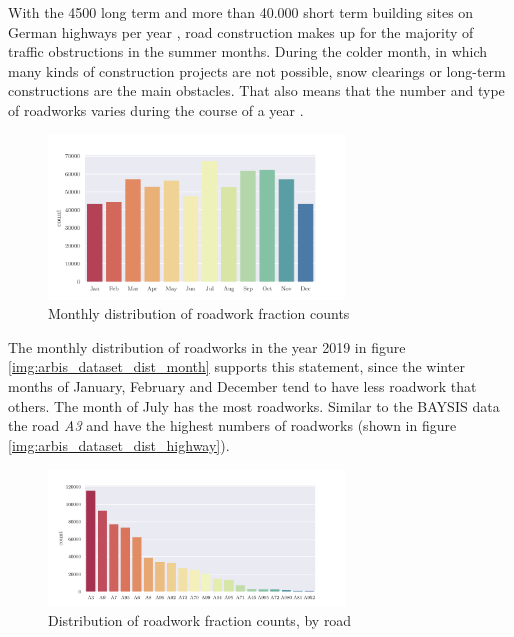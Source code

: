 With the 4500 long term and more than 40.000 short term building sites on German highways per year \parencite{LAPID2018,Stmi2020}, road construction makes up for the majority of traffic obstructions in the summer months. During the colder month, in which many kinds of construction projects are not possible, snow clearings or long-term constructions are the main obstacles. That also means that the number and type of roadworks varies during the course of a year \parencite{Stmi2020}. 
\begin{figure}[ht]
	\centering
	\includegraphics[width=0.7\textwidth]{../CorrAnalysis/data/ArbIS/01_dataset/plots/arbis_dataset_hist_month}
	\caption{Monthly distribution of roadwork fraction counts}
	\label{img:arbis_dataset_dist_month}
\end{figure}
The monthly distribution of roadworks in the year 2019 in figure \autoref{img:arbis_dataset_dist_month} supports this statement, since the winter months of January, February and December tend to have less roadwork that others. The month of July has the most roadworks. Similar to the BAYSIS data the road \textit{A3} and  have the highest numbers of roadworks (shown in figure \autoref{img:arbis_dataset_dist_highway}).
\begin{figure}[ht]
	\centering
	\includegraphics[width=0.7\textwidth]{../CorrAnalysis/data/ArbIS/01_dataset/plots/arbis_dataset_hist_highway}
	\caption{Distribution of roadwork fraction counts, by road}
	\label{img:arbis_dataset_dist_highway}
\end{figure}

